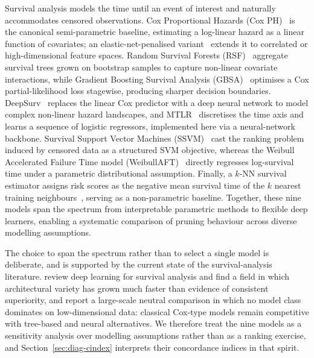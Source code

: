 \documentclass[a4paper,fleqn]{cas-dc}
\begin{document}
Survival analysis models the time until an event of interest and naturally
accommodates censored observations. Cox Proportional Hazards (Cox
PH)~\citep{cox1972regression} is the canonical semi-parametric baseline,
estimating a log-linear hazard as a linear function of covariates; an
elastic-net-penalised variant~\citep{simon2011regularization} extends it to
correlated or high-dimensional feature spaces. Random Survival Forests
(RSF)~\citep{ishwaran2008random} aggregate survival trees grown on bootstrap
samples to capture non-linear covariate interactions, while Gradient Boosting
Survival Analysis (GBSA)~\citep{hothorn2006survival} optimises a Cox
partial-likelihood loss stagewise, producing sharper decision boundaries.
DeepSurv~\citep{katzman2018deepsurv} replaces the linear Cox predictor with a
deep neural network to model complex non-linear hazard landscapes, and
MTLR~\citep{yu2011learning} discretises the time axis and learns a sequence of
logistic regressors, implemented here via a neural-network backbone. Survival
Support Vector Machines (SSVM)~\citep{van2007support} cast the ranking problem
induced by censored data as a structured SVM objective, whereas the Weibull
Accelerated Failure Time model (WeibullAFT)~\citep{wei1992accelerated} directly
regresses log-survival time under a parametric distributional assumption.
Finally, a $k$-NN survival estimator assigns risk scores as the negative mean
survival time of the $k$ nearest training neighbours~\citep{pedregosa2011scikit},
serving as a non-parametric baseline. Together, these nine models span the
spectrum from interpretable parametric methods to flexible deep learners,
enabling a systematic comparison of pruning behaviour across diverse modelling
assumptions.

The choice to span the spectrum rather than to select a single model is
deliberate, and is supported by the current state of the survival-analysis
literature. \citet{wiegrebe2024dlsurvival} review deep learning for survival
analysis and find a field in which architectural variety has grown much faster
than evidence of consistent superiority, and \citet{burk2026neutral} report a
large-scale neutral comparison in which no model class dominates on
low-dimensional data: classical Cox-type models remain competitive with
tree-based and neural alternatives. We therefore treat the nine models as a
sensitivity analysis over modelling assumptions rather than as a ranking
exercise, and Section~\ref{sec:diag-cindex} interprets their concordance indices
in that spirit.

\end{document}

